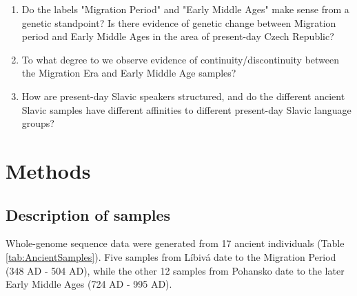\begin{enumerate}
\item Do the labels "Migration Period" and "Early Middle Ages" make sense from a genetic standpoint? Is there evidence of genetic change between Migration period and Early Middle Ages in the area of present-day Czech Republic? 
\item To what degree to we observe evidence of continuity/discontinuity between the Migration Era and Early Middle Age samples?
\item How are present-day Slavic speakers structured, and do the different ancient Slavic samples have different affinities to different present-day Slavic language groups?
\end{enumerate}


\section{Methods}

\subsection{Description of samples}

Whole-genome sequence data were generated from 17 ancient individuals (Table \ref{tab:AncientSamples}). Five samples from Líbivá date to the Migration Period (348 AD - 504 AD), while the other 12 samples from Pohansko date to the later Early Middle Ages (724 AD - 995 AD).

